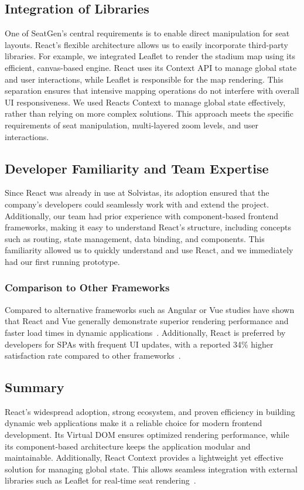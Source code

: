 \subsection{Integration of Libraries}
One of SeatGen’s central requirements is to enable direct manipulation for seat layouts. React’s flexible architecture allows us to easily incorporate third-party libraries. For example, we integrated Leaflet to render the stadium map using its efficient, canvas-based engine. React uses its Context API to manage global state and user interactions, while Leaflet is responsible for the map rendering. This separation ensures that intensive mapping operations do not interfere with overall UI responsiveness. We used Reacts Context to manage global state effectively, rather than relying on more complex solutions. This approach meets the specific requirements of seat manipulation, multi-layered zoom levels, and user interactions.

\subsection{Developer Familiarity and Team Expertise}
Since React was already in use at Solvistas, its adoption ensured that the company’s developers could seamlessly work with and extend the project. Additionally, our team had prior experience with component-based frontend frameworks, making it easy to understand React’s structure, including concepts such as routing, state management, data binding, and components. This familiarity allowed us to quickly understand and use React, and we immediately had our first running prototype.

\subsubsection{Comparison to Other Frameworks}
Compared to alternative frameworks such as Angular or Vue studies have shown that React and Vue generally demonstrate superior rendering performance and faster load times in dynamic applications~\cite{SPAComp}. Additionally, React is preferred by developers for SPAs with frequent UI updates, with a reported 34\% higher satisfaction rate compared to other frameworks~\cite{SPAComp}. 

\subsection{Summary}
React’s widespread adoption, strong ecosystem, and proven efficiency in building dynamic web applications make it a reliable choice for modern frontend development. Its Virtual DOM ensures optimized rendering performance, while its component-based architecture keeps the application modular and maintainable. Additionally, React Context provides a lightweight yet effective solution for managing global state. This allows seamless integration with external libraries such as Leaflet for real-time seat rendering~\cite{ReactVirtualDOM, ReactCBA01}. 

